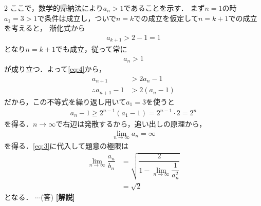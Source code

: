 \documentclass[../../main.tex]{subfiles}
\begin{document}
\begin{multicols}{2}
  ここで，数学的帰納法により$a_n>1$であることを示す．
  まず$n=1$の時$a_1=3>1$で条件は成立し，ついで$n=k$での成立を仮定して$n=k+1$での成立を考えると，
  漸化式から
  \begin{align}
    a_{k+1} > 2-1=1
  \end{align}
  となり$n=k+1$でも成立，従って常に
  \begin{align}
    a_n>1
  \end{align}
  が成り立つ．よって\cref{eq:4}から，
  \begin{align}
    a_{n+1}   & > 2a_n -1             \\
    \therefore
    a_{n+1}-1 & >2 \left(a_n-1\right)
  \end{align}
  だから，この不等式を繰り返し用いて$a_1=3$を使うと
  \begin{align}
    a_n-1 \ge 2^{n-1}(a_1-1) = 2^{n-1}\cdot 2 = 2^n
  \end{align}
  を得る．$n\to\infty$で右辺は発散するから，追い出しの原理から，
  \begin{align}
    \lim_{n\to\infty} a_n = \infty
  \end{align}
  を得る．\cref{eq:3}に代入して題意の極限は
  \begin{align}
    \lim_{n\to\infty}\dfrac{a_n}{b_n}
    & = \sqrt{\dfrac{2}{1-\lim_{n\to\infty}\dfrac{1}{a^2_n}}} \\
    & = \sqrt{2}
  \end{align}
  となる．    $\cdots$(答)
  {\bf [解説]}

  \newpage
\end{multicols}
\end{document}
